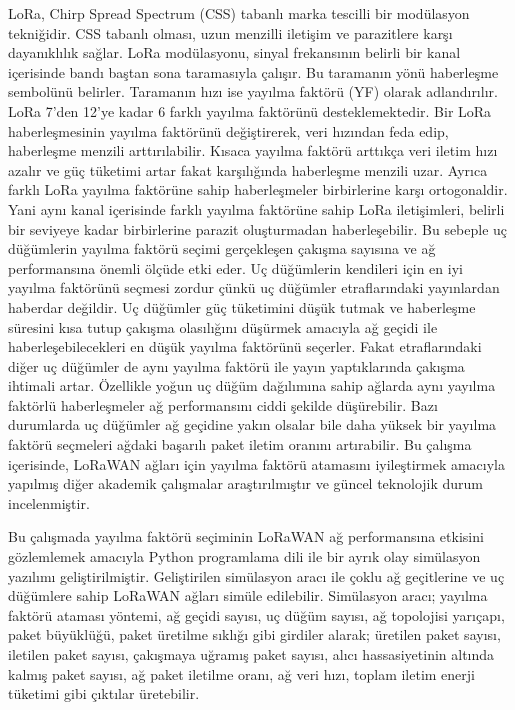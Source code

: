 LoRa, Chirp Spread Spectrum (CSS) tabanlı marka tescilli bir modülasyon tekniğidir. CSS tabanlı olması, uzun menzilli iletişim ve parazitlere karşı dayanıklılık sağlar. LoRa modülasyonu, sinyal frekansının belirli bir kanal içerisinde bandı baştan sona taramasıyla çalışır. Bu taramanın yönü haberleşme sembolünü belirler. Taramanın hızı ise yayılma faktörü (YF) olarak adlandırılır. LoRa 7'den 12'ye kadar 6 farklı yayılma faktörünü desteklemektedir. Bir LoRa haberleşmesinin yayılma faktörünü değiştirerek, veri hızından feda edip, haberleşme menzili arttırılabilir. Kısaca yayılma faktörü arttıkça veri iletim hızı azalır ve güç tüketimi artar fakat karşılığında haberleşme menzili uzar. Ayrıca farklı LoRa yayılma faktörüne sahip haberleşmeler birbirlerine karşı ortogonaldir. Yani aynı kanal içerisinde farklı yayılma faktörüne sahip LoRa iletişimleri, belirli bir seviyeye kadar birbirlerine parazit oluşturmadan haberleşebilir. Bu sebeple uç düğümlerin yayılma faktörü seçimi gerçekleşen çakışma sayısına ve ağ performansına önemli ölçüde etki eder. Uç düğümlerin kendileri için en iyi yayılma faktörünü seçmesi zordur çünkü uç düğümler etraflarındaki yayınlardan haberdar değildir. Uç düğümler güç tüketimini düşük tutmak ve haberleşme süresini kısa tutup çakışma olasılığını düşürmek amacıyla ağ geçidi ile haberleşebilecekleri en düşük yayılma faktörünü seçerler. Fakat etraflarındaki diğer uç düğümler de aynı yayılma faktörü ile yayın yaptıklarında çakışma ihtimali artar. Özellikle yoğun uç düğüm dağılımına sahip ağlarda aynı yayılma faktörlü haberleşmeler ağ performansını ciddi şekilde düşürebilir. Bazı durumlarda uç düğümler ağ geçidine yakın olsalar bile daha yüksek bir yayılma faktörü seçmeleri ağdaki başarılı paket iletim oranını artırabilir. Bu çalışma içerisinde, LoRaWAN ağları için yayılma faktörü atamasını iyileştirmek amacıyla yapılmış diğer akademik çalışmalar araştırılmıştır ve güncel teknolojik durum incelenmiştir.

Bu çalışmada yayılma faktörü seçiminin LoRaWAN ağ performansına etkisini gözlemlemek amacıyla Python programlama dili ile bir ayrık olay simülasyon yazılımı geliştirilmiştir. Geliştirilen simülasyon aracı ile çoklu ağ geçitlerine ve uç düğümlere sahip LoRaWAN ağları simüle edilebilir. Simülasyon aracı; yayılma faktörü ataması yöntemi, ağ geçidi sayısı, uç düğüm sayısı, ağ topolojisi yarıçapı, paket büyüklüğü, paket üretilme sıklığı gibi girdiler alarak; üretilen paket sayısı, iletilen paket sayısı, çakışmaya uğramış paket sayısı, alıcı hassasiyetinin altında kalmış paket sayısı, ağ paket iletilme oranı, ağ veri hızı, toplam iletim enerji tüketimi gibi çıktılar üretebilir. 

